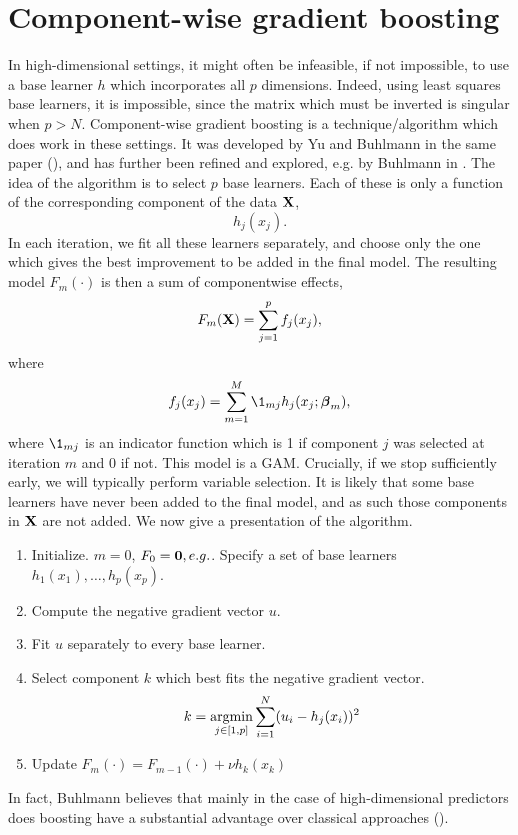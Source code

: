 \section{Component-wise gradient boosting}
In high-dimensional settings, it might often be infeasible, if not impossible, to use a base learner $h$ which incorporates all $p$ dimensions. Indeed, using least squares base learners, it is impossible, since the matrix which must be inverted is singular when $p>N$. Component-wise gradient boosting is a technique/algorithm which does work in these settings. It was developed by Yu and Buhlmann in the same paper (\cite{buhlmann-yu}), and has further been refined and explored, e.g. by Buhlmann in \cite{buhlmann2006}. The idea of the algorithm is to select $p$ base learners. Each of these is only a function of the corresponding component of the data $\mathbf{X}$,
\begin{equation}
    h_j(x_j).
\end{equation}
In each iteration, we fit all these learners separately, and choose only the one which gives the best improvement to be added in the final model. The resulting model $F_m(\cdot)$ is then a sum of componentwise effects,
\begin{equation}
    F_m(\mathbf{X})=\sum_{j=1}^pf_j(x_j),
\end{equation}
where
\begin{equation}
    f_j(x_j)=\sum_{m=1}^M\1_{mj}h_j(x_j;\bbeta_m),
\end{equation}
where $\1_{mj}$ is an indicator function which is 1 if component $j$ was selected at iteration $m$ and 0 if not.
This model is a GAM. Crucially, if we stop sufficiently early, we will typically perform variable selection. It is likely that some base learners have never been added to the final model, and as such those components in $\mathbf{X}$ are not added. We now give a presentation of the algorithm.
\begin{enumerate}
    \item Initialize. $m=0$, $F_0=\mathbf{0}, e.g.$. Specify a set of base learners $h_1(x_1),\dotsc,h_p(x_p)$.
    \item Compute the negative gradient vector $u$.
    \item Fit $u$ separately to every base learner.
    \item Select component $k$ which best fits the negative gradient vector.
        \begin{equation}
            k=\operatorname*{argmin}_{j\in[1,p]}\sum_{i=1}^N(u_i-h_j(x_i))^2
        \end{equation}
    \item Update $F_m(\cdot)=F_{m-1}(\cdot)+\nu h_k(x_k)$
\end{enumerate}
In fact, Buhlmann believes that mainly in the case of high-dimensional predictors does boosting have a substantial advantage over classical approaches (\cite{buhlmann2006}).